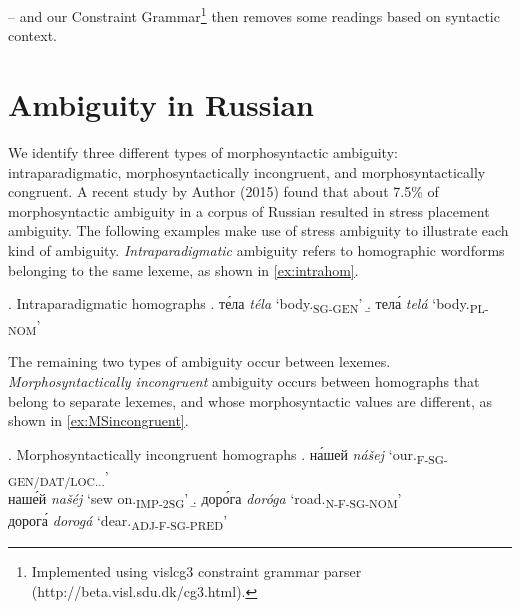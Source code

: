 \documentclass[11pt]{article}
\newcommand{\rus}[1]{\foreignlanguage{russian}{#1}}
\begin{document}

 -- and our Constraint 
Grammar\footnote{Implemented using vislcg3 constraint grammar parser
(http://beta.visl.sdu.dk/cg3.html).}
\cite{Karlsson-90,Karlsson.Voutilainen.ea-95} then removes
some readings based on syntactic context.

\cite{trosterud2009}


\cite{peradin12} 

\section{Ambiguity in Russian} \label{ambiguity}

We identify three different types of morphosyntactic ambiguity: 
intraparadigmatic, morphosyntactically incongruent, and morphosyntactically 
congruent. A recent study by Author (2015) found that about 7.5\% of 
morphosyntactic ambiguity in a corpus of Russian resulted in stress placement 
ambiguity. The following examples make use of stress ambiguity to illustrate 
each kind of ambiguity. \emph{Intraparadigmatic} ambiguity refers to homographic 
wordforms belonging to the same lexeme, as shown in \ref{ex:intrahom}. 

\ex. Intraparadigmatic homographs \label{ex:intrahom}
\a. \rus{т\'{е}ла} \emph{t\'{e}la} `body.\textsubscript{SG-GEN}' 
    \label{ex:bodySGGEN}
\b. \rus{тел\'{а}} \emph{tel\'{a}} `body.\textsubscript{PL-NOM}' 
    \label{ex:bodyPLNOM}

The remaining two types of ambiguity occur between lexemes. 
\emph{Morphosyntactically incongruent} ambiguity occurs between homographs that 
belong to separate lexemes, and whose morphosyntactic values are different, as 
shown in \ref{ex:MSincongruent}.

\ex. Morphosyntactically incongruent homographs \label{ex:MSincongruent}
\a. \rus{н\'{а}шей} \emph{nášej} `our.\textsubscript{F-SG-GEN/DAT/LOC...}'\\
    \rus{наш\'{е}й} \emph{našéj} `sew on.\textsubscript{IMP-2SG}'
\b. \rus{дор\'{о}га} \emph{doróga} `road.\textsubscript{N-F-SG-NOM}'\\
    \rus{дорог\'{а}} \emph{dorogá} `dear.\textsubscript{ADJ-F-SG-PRED}'
\end{document}
